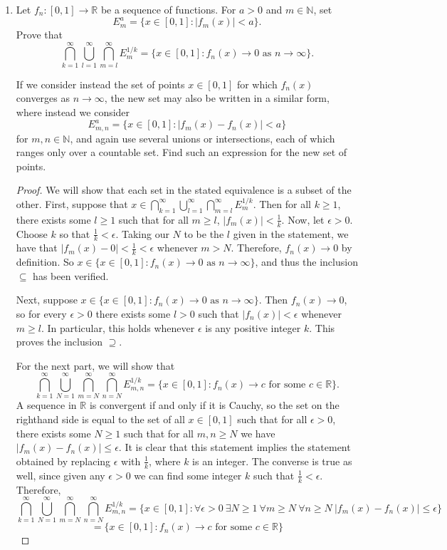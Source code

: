 \documentclass[10pt]{article}
\newcommand{\R}{\mathbb{R}}
\newcommand{\N}{\mathbb{N}}
\begin{document}
\begin{enumerate}
\item Let $f_n : [0,1] \rightarrow \R$ be a sequence of functions.  For $a > 0$ and $m \in \N$, set
$$
E_m^a = \{x \in [0,1] : |f_m(x)| < a \}.
$$
Prove that
$$
\bigcap_{k=1}^\infty \bigcup_{l = 1}^\infty \bigcap_{m = l}^\infty E_m^{1/k} = \{x \in [0,1] : f_n(x) \rightarrow 0 \text{ as } n \rightarrow \infty \}.
$$

If we consider instead the set of points $x \in [0,1]$ for which $f_n(x)$ converges as $n \rightarrow \infty$, the new set may also be written in a similar form, where instead we consider
$$
E_{m,n}^a = \{x \in [0,1] : |f_m(x) - f_n(x)| < a \}
$$
for $m,n \in \N$, and again use several unions or intersections, each of which ranges only over a countable set.  Find such an expression for the new set of points.

\begin{proof}
We will show that each set in the stated equivalence is a subset of the other.  First, suppose that $x \in \bigcap\limits_{k=1}^\infty \bigcup\limits_{l = 1}^\infty \bigcap\limits_{m = l}^\infty E_m^{1/k}$.  Then for all $k \geq 1$, there exists some $l \geq 1$ such that for all $m \geq l$, $|f_m(x)| < \frac{1}{k}$.  Now, let $\epsilon > 0$.  Choose $k$ so that $\frac{1}{k} < \epsilon$.  Taking our $N$ to be the $l$ given in the statement, we have that $|f_m(x) - 0| < \frac{1}{k} < \epsilon$ whenever $m > N$.  Therefore, $f_n(x) \rightarrow 0$ by definition.  So $x \in \{x \in [0,1] : f_n(x) \rightarrow 0 \text{ as } n \rightarrow \infty \}$, and thus the inclusion $\subseteq$ has been verified.

Next, suppose $x \in \{x \in [0,1] : f_n(x) \rightarrow 0 \text{ as } n \rightarrow \infty \}$.  Then $f_n(x) \rightarrow 0$, so for every $\epsilon > 0$ there exists some $l > 0$ such that $|f_n(x)| < \epsilon$ whenever $m \geq l$.  In particular, this holds whenever $\epsilon$ is any positive integer $k$.  This proves the inclusion $\supseteq$.

For the next part, we will show that
$$
\bigcap\limits_{k=1}^\infty \bigcup\limits_{N=1}^\infty \bigcap\limits_{m=N}^\infty \bigcap\limits_{n=N}^\infty E_{m,n}^{1/k} = \{x \in [0,1]: f_n(x) \rightarrow c \text{ for some } c \in \R \}.$$
A sequence in $\R$ is convergent if and only if it is Cauchy, so the set on the righthand side is equal to the set of all $x \in [0,1]$ such that for all $\epsilon > 0$, there exists some $N \geq 1$ such that for all $m,n \geq N$ we have $|f_m(x) - f_n(x)| \leq \epsilon$.  It is clear that this statement implies the statement obtained by replacing $\epsilon$ with $\frac{1}{k}$, where $k$ is an integer.  The converse is true as well, since given any $\epsilon > 0$ we can find some integer $k$ such that $\frac{1}{k} < \epsilon$.  Therefore,
$$
\bigcap\limits_{k=1}^\infty \bigcup\limits_{N=1}^\infty \bigcap\limits_{m=N}^\infty \bigcap\limits_{n=N}^\infty E_{m,n}^{1/k}
= \{x \in [0,1]: \forall \epsilon > 0 \  \exists N \geq 1 \ \forall m \geq N \ \forall n \geq N \ |f_m(x) - f_n(x)| \leq \epsilon \}
$$
$$
= \{x \in [0,1]: f_n(x) \rightarrow c \text{ for some } c \in \R \}
$$
\end{proof}


\end{enumerate}
\end{document}
